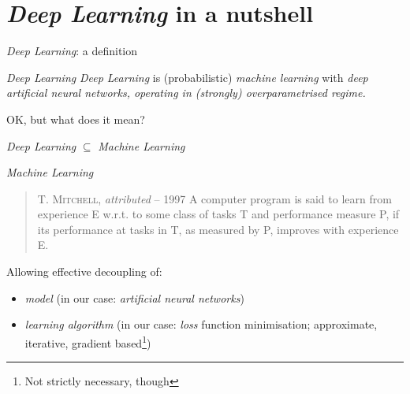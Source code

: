 
\section{ \textit{Deep Learning} in a nutshell}{

    \begin{frame}{ \textit{Deep Learning}: a definition}

        \begin{block}{\textit{Deep Learning}}
            \textit{Deep Learning} is (probabilistic) \alert{\textit{machine learning}} with \textit{deep artificial \alert{neural networks}, operating in (strongly) \alert{overparametrised} regime.}
        \end{block}
        \begin{center}
            OK, but what does it mean?
        \end{center}

    \end{frame}

    \begin{frame}{ \textit{Deep Learning} $\subseteq$  \textit{Machine Learning}}

        \begin{block}{\textit{Machine Learning}}

            \begin{quote}{\textsc{T. Mitchell}, \textit{attributed} -- 1997}
                \hfill\break
                A computer program is said to learn from experience E w.r.t. to some class of tasks
                T and performance measure P, if its performance at tasks in T, as measured by P,
                improves with experience E.
            \end{quote}
        \end{block}

        Allowing effective decoupling of:
        \begin{itemize}
            \item \alert{\textit{model}} (in our case: \textit{artificial neural networks})
            \item \alert{\textit{learning algorithm}} (in our case: \textit{loss} function minimisation; approximate, iterative, gradient based\footnote{Not strictly necessary, though})
        \end{itemize}
    \end{frame}
    \setcounter{footnote}{0}

}
